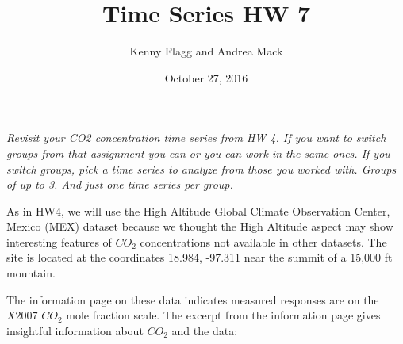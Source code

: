 \documentclass[11pt]{article}\usepackage[]{graphicx}\usepackage[]{color}
\title{Time Series HW 7}
\author{Kenny Flagg and Andrea Mack}
\date{October 27, 2016}
\begin{document}
\maketitle



{\it Revisit your CO2 concentration time series from HW 4. If you want to switch groups from that assignment you can or you can work in the same ones. If you switch groups, pick a time series to analyze from those you worked with. Groups of up to 3. And just one time series per group.}

As in HW4, we will use the High Altitude Global Climate Observation Center, Mexico (MEX) dataset because we thought the High Altitude aspect may show interesting features of $CO_{2}$ concentrations not available in other datasets. The site is located at the coordinates 18.984, -97.311 near the summit of a 15,000 ft mountain.

The information page on these data indicates measured responses are on the $X2007$ $CO_2$ mole fraction scale. The excerpt from the information page gives insightful information about $CO_2$ and the data:
\end{document}
